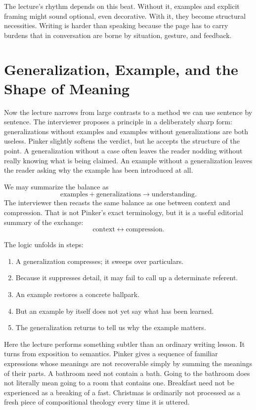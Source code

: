 The lecture's rhythm depends on this beat. Without it, examples and explicit framing might sound optional, even decorative. With it, they become structural necessities. Writing is harder than speaking because the page has to carry burdens that in conversation are borne by situation, gesture, and feedback.

\section{Generalization, Example, and the Shape of Meaning}

Now the lecture narrows from large contrasts to a method we can use sentence by sentence. The interviewer proposes a principle in a deliberately sharp form: generalizations without examples and examples without generalizations are both useless. Pinker slightly softens the verdict, but he accepts the structure of the point. A generalization without a case often leaves the reader nodding without really knowing what is being claimed. An example without a generalization leaves the reader asking why the example has been introduced at all.

We may summarize the balance as
\begin{equation}
\text{examples} + \text{generalizations} \to \text{understanding}.
\end{equation}
The interviewer then recasts the same balance as one between context and compression. That is not Pinker's exact terminology, but it is a useful editorial summary of the exchange:
\begin{equation}
\text{context} \leftrightarrow \text{compression}.
\end{equation}

The logic unfolds in steps:
\begin{enumerate}
\item A generalization compresses; it sweeps over particulars.
\item Because it suppresses detail, it may fail to call up a determinate referent.
\item An example restores a concrete ballpark.
\item But an example by itself does not yet say what has been learned.
\item The generalization returns to tell us why the example matters.
\end{enumerate}

Here the lecture performs something subtler than an ordinary writing lesson. It turns from exposition to semantics. Pinker gives a sequence of familiar expressions whose meanings are not recoverable simply by summing the meanings of their parts. A bathroom need not contain a bath. Going to the bathroom does not literally mean going to a room that contains one. Breakfast need not be experienced as a breaking of a fast. Christmas is ordinarily not processed as a fresh piece of compositional theology every time it is uttered.

